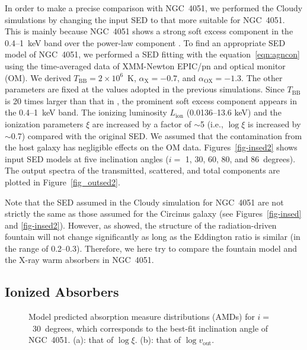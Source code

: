 \documentclass[twocolumn,times,twocolappendix]{aastex63}
\begin{document}
In order to make a precise comparison with NGC~4051,
we performed the \textsf{Cloudy} 
simulations by changing the input SED to
that more suitable for NGC~4051. This is mainly because NGC~4051 
shows a strong soft excess component
in the 0.4--1~keV band over the power-law component
\citep[e.g.,][]{Nucita2010,Mizumoto2017,Ogawa2021}.
To find an appropriate SED model of NGC~4051,
we performed a 
SED fitting with the equation~\ref{eqn:agncon} using the time-averaged data of
XMM-Newton \citep{Jansen2001} EPIC/pn and optical monitor (OM). 
We derived $T_\mathrm{BB} = 2\times10^6$~K, $\alpha_\mathrm{X} = -0.7$, and $\alpha_\mathrm{OX} = -1.3$.
The other parameters are fixed at the values adopted in the previous simulations.
Since 
$T_\mathrm{BB}$ is 20 times larger than that in \citet{Wada2018b},
the prominent soft excess component appears in the 0.4--1~keV band.
The ionizing luminosity $L_\mathrm{ion}$ (0.0136--13.6 keV) and  
the ionization parameters $\xi$ are increased by a factor of $\sim$5 (i.e., $\log \xi$ is increased by $\sim$0.7) compared with the original SED.
We assumed that the contamination from the host galaxy
has negligible effects on the OM data.
Figures~\ref{fig-insed2}
shows input SED models
at five
inclination angles ($i=$ 1, 30, 60, 80, and 86~degrees).
The output spectra of the transmitted, scattered, and total components are
plotted in Figure~\ref{fig_outsed2}.


Note that the SED assumed in the \textsf{Cloudy} simulation for NGC~4051 are not strictly the same as those assumed for the Circinus galaxy \citep{Wada2016} (see Figures~\ref{fig-insed} and \ref{fig-insed2}). 
However, as \citet{Wada2015} showed, the structure of the radiation-driven fountain will not change significantly as long as the Eddington ratio is similar 
(in the range of 0.2--0.3). Therefore, we here try to compare the fountain model and the X-ray warm absorbers in NGC~4051.  



\subsection{Ionized Absorbers}
\label{4-1}

\begin{figure}
\caption{
Model predicted absorption measure
distributions (AMDs) for $i=$~30~degrees, which corresponds to the best-fit inclination angle of NGC~4051. 
(a): that of $\log \xi$.
(b): that of $\log v_\mathrm{out}$.
}
\label{fig-amd}
\end{figure}
\end{document}
